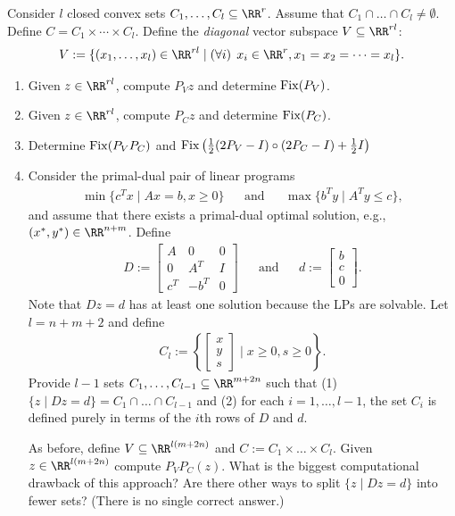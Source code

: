 \documentclass[11pt]{article}
\begin{document}
\begin{enumerate}
Consider $l$ closed convex sets $C_1, \ldots, C_l \subseteq \RR^r$. Assume that $C_1 \cap \ldots\cap C_l \neq \emptyset.$ Define $C = C_1\times \cdots \times C_l$. Define the \textit{diagonal} vector subspace $V \subseteq \RR^{rl}$:
\begin{align*}
V : = \{(x_1, \ldots, x_l)  \in \RR^{rl} \mid \left(\forall i \right)\;  x_i \in \RR^r, x_1 = x_2 = \cdots= x_l\}.
\end{align*} 
\begin{enumerate}
\item Given $z \in\RR^{rl}$, compute $P_Vz$ and determine $\mathrm{Fix}(P_V)$.
\item Given $z \in \RR^{rl}$, compute $P_{C}z$ and determine $\mathrm{Fix}(P_{C})$.
\item Determine $\mathrm{Fix}(P_V P_C)$ and $\mathrm{Fix}\left(\frac{1}{2}(2P_V - I) \circ (2P_C - I) + \frac{1}{2} I\right)$
\item Consider the primal-dual pair of linear programs
\begin{align*}
\min\{ c^Tx \mid Ax = b, x \geq 0\} && \text{and} && \max\{b^T y \mid A^T y\leq  c\},
\end{align*}
and assume that there exists a primal-dual optimal solution, e.g., $(x^\ast, y^\ast) \in \RR^{n+m}$. Define
\begin{align*}
D := \begin{bmatrix}
A & 0 & 0 \\
0 & A^T & I \\
c^T & - b^T & 0 
\end{bmatrix}
&& \text{and} && d := \begin{bmatrix} 
b \\
c \\ 
0
\end{bmatrix}.
\end{align*}
Note that $Dz = d$ has at least one solution because the LPs are solvable. Let $l = n + m +2$ and define
\begin{align*}
C_l := \left\{ \begin{bmatrix} x \\ y \\ s \end{bmatrix} \mid  x \geq 0, s \geq 0\right\}.
\end{align*}
Provide $l - 1$ sets $C_1, \ldots, C_{l-1} \subseteq \RR^{m + 2n}$ such that (1) $\{ z \mid Dz = d\} = C_1 \cap \ldots \cap C_{l-1}$ and (2) for each $i = 1, \ldots, l-1$, the set $C_i$ is defined purely in terms of the $i$th rows of $D$ and $d$.

As before, define $V \subseteq \RR^{l(m+2n)}$  and $C := C_1 \times \ldots \times C_l$. Given $z \in \RR^{l(m + 2n)}$ compute  $P_V P_C (z)$.  What is the biggest computational drawback of this approach? Are there other ways to split $\{z \mid Dz = d\}$ into fewer sets? (There is no single correct answer.) 
\end{enumerate}
\end{enumerate}
\end{document}
